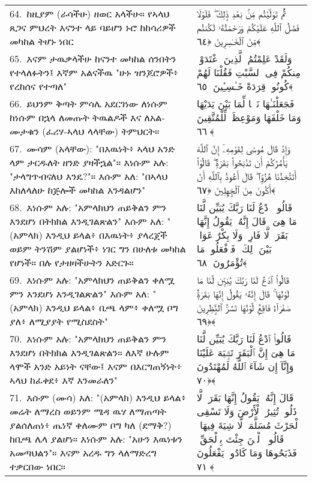 \documentclass[11pt,a4paper,oneside]{article}%
\newcommand{\mytextarabic}[1]{\textarabic{ #1 \flushright}}
\begin{document}
\begin{longtable}{%
  @{}
    p{}
  @{~~~}
    p{}
    @{}
}
64.\ ከዚያም (ራሳችሁ) ዘወር አላችሁ። የኣላህ ጸጋና ምህረት እናንተ ላይ ባይሆን ኑሮ ከከሳሪዎች መካከል ትሆኑ ነበር &  \mytextarabic{ثُمَّ تَوَلَّيْتُم مِّنۢ بَعْدِ ذَٟلِكَ ۖ فَلَوْلَا فَضْلُ ٱللَّهِ عَلَيْكُمْ وَرَحْمَتُهُۥ لَكُنتُم مِّنَ ٱلْخَـٰسِرِينَ ﴿٦٤﴾}\\
65.\ እናም ታዉቃላችሁ ከናንተ መካከል ሰንበትን የተላለፉትን፤ እኛም አልናችዉ "ሁኑ ዝንጆሮዎች፥ የረከሰና የተጣለ" &  \mytextarabic{وَلَقَدْ عَلِمْتُمُ ٱلَّذِينَ ٱعْتَدَوْا۟ مِنكُمْ فِى ٱلسَّبْتِ فَقُلْنَا لَهُمْ كُونُوا۟ قِرَدَةً خَـٰسِـِٔينَ ﴿٦٥﴾}\\
66.\ ይህንም ቅጣት ምሳሌ አደርገነው ለነሱም ከነሱም በኋላ ለመጡት ትዉልዶች እና  ለአል-ሙታቁን (ፈሪሃ-ኣላህ ላላቸው) ትምህርት። &  \mytextarabic{فَجَعَلْنَـٰهَا نَكَٟلًۭا لِّمَا بَيْنَ يَدَيْهَا وَمَا خَلْفَهَا وَمَوْعِظَةًۭ لِّلْمُتَّقِينَ ﴿٦٦﴾}\\
67.\ ሙሳም (አላቸው): "በእዉነት፥ ኣላህ አንድ ላም ታርዱለት ዘንድ ያዛችኋል"። እነሱም አሉ: "ታላግጥብናለህ እንዴ?"። እሱም አለ: "በኣላህ እከለላለሁ ከጅሎች መካከል እንዳልሆን" &  \mytextarabic{وَإِذْ قَالَ مُوسَىٰ لِقَوْمِهِۦٓ إِنَّ ٱللَّهَ يَأْمُرُكُمْ أَن تَذْبَحُوا۟ بَقَرَةًۭ ۖ قَالُوٓا۟ أَتَتَّخِذُنَا هُزُوًۭا ۖ قَالَ أَعُوذُ بِٱللَّهِ أَنْ أَكُونَ مِنَ ٱلْجَٟهِلِينَ ﴿٦٧﴾}\\
68.\ እነሱም አሉ: "አምላክህን ጠይቅልን ምን እንደሆነ በትክክል እንዲገልጽልን" እሱም አለ: "(አምላክ) እንዲህ ይላል፥  በእዉነት፥ ያላረጀች ወይም  ትንሽም ያልሆነች፥ ነገር ግን በሁለቱ መካከል የሆነች። በሉ የታዘዛችሁትን አድርጉ። &  \mytextarabic{قَالُوا۟ ٱدْعُ لَنَا رَبَّكَ يُبَيِّن لَّنَا مَا هِىَ ۚ قَالَ إِنَّهُۥ يَقُولُ إِنَّهَا بَقَرَةٌۭ لَّا فَارِضٌۭ وَلَا بِكْرٌ عَوَانٌۢ بَيْنَ ذَٟلِكَ ۖ فَٱفْعَلُوا۟ مَا تُؤْمَرُونَ ﴿٦٨﴾}\\
69.\ እነሱም አሉ: "አምላክህን ጠይቅልን ቀለሟ ምን እንደሆነ እንዲገልጽልን" እሱም አለ: "(አምላክ) እንዲህ ይላል፥ ቢጫ ላም፥ ቀለሟ ቦግ ያለ፥ ለሚያያት የሚስደስት" &  \mytextarabic{قَالُوا۟ ٱدْعُ لَنَا رَبَّكَ يُبَيِّن لَّنَا مَا لَوْنُهَا ۚ قَالَ إِنَّهُۥ يَقُولُ إِنَّهَا بَقَرَةٌۭ صَفْرَآءُ فَاقِعٌۭ لَّوْنُهَا تَسُرُّ ٱلنَّٟظِرِينَ ﴿٦٩﴾}\\
70.\ እነሱም አሉ: "አምላክህን ጠይቅልን ምን እንደሆነ በትክክል እንዲገልጽልን። ለእኛ ሁሉም ላሞች አንድ አይነት ናቸው፤ እናም በእርግጠኝነት፥ ኣላህ ከፈቀደ፥ እኛ እንመራለን"  &  \mytextarabic{قَالُوا۟ ٱدْعُ لَنَا رَبَّكَ يُبَيِّن لَّنَا مَا هِىَ إِنَّ ٱلْبَقَرَ تَشَٟبَهَ عَلَيْنَا وَإِنَّآ إِن شَآءَ ٱللَّهُ لَمُهْتَدُونَ ﴿٧٠﴾}\\
71.\ እሱም (ሙሳ) አለ: "(አምላክ) እንዲህ ይላል፥ መሬት ለማረስ ወይንም ሜዳ ዉሃ ለማጠጣት ያልሰለጠነ፥ ጤነኛ ቀለሙም ቦግ ካለ (ደማቅ?) ከቢጫ ሌላ ያልሆነ። እነሱም አሉ: "አሁን እዉነቱን አመጣህልን"። እናም አረዱ ግን ላለማድረግ ተቃርበው ነበር። &  \mytextarabic{قَالَ إِنَّهُۥ يَقُولُ إِنَّهَا بَقَرَةٌۭ لَّا ذَلُولٌۭ تُثِيرُ ٱلْأَرْضَ وَلَا تَسْقِى ٱلْحَرْثَ مُسَلَّمَةٌۭ لَّا شِيَةَ فِيهَا ۚ قَالُوا۟ ٱلْـَٟٔنَ جِئْتَ بِٱلْحَقِّ ۚ فَذَبَحُوهَا وَمَا كَادُوا۟ يَفْعَلُونَ ﴿٧١﴾}\\

\end{longtable}
\end{document}

